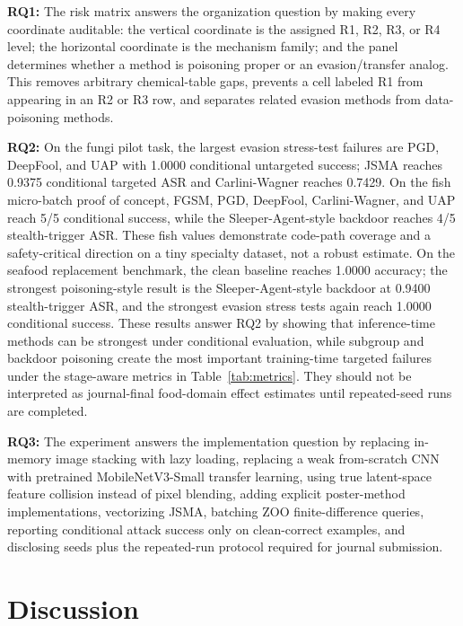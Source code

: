 ﻿\documentclass[6p,10pt,times]{ieeeaccess}
\begin{document}
\textbf{RQ1:} The risk matrix answers the organization question by making every coordinate auditable: the vertical coordinate is the assigned R1, R2, R3, or R4 level; the horizontal coordinate is the mechanism family; and the panel determines whether a method is poisoning proper or an evasion/transfer analog. This removes arbitrary chemical-table gaps, prevents a cell labeled R1 from appearing in an R2 or R3 row, and separates related evasion methods from data-poisoning methods.

\textbf{RQ2:} On the fungi pilot task, the largest evasion stress-test failures are PGD, DeepFool, and UAP with 1.0000 conditional untargeted success; JSMA reaches 0.9375 conditional targeted ASR and Carlini-Wagner reaches 0.7429. On the fish micro-batch proof of concept, FGSM, PGD, DeepFool, Carlini-Wagner, and UAP reach 5/5 conditional success, while the Sleeper-Agent-style backdoor reaches 4/5 stealth-trigger ASR. These fish values demonstrate code-path coverage and a safety-critical direction on a tiny specialty dataset, not a robust estimate. On the seafood replacement benchmark, the clean baseline reaches 1.0000 accuracy; the strongest poisoning-style result is the Sleeper-Agent-style backdoor at 0.9400 stealth-trigger ASR, and the strongest evasion stress tests again reach 1.0000 conditional success. These results answer RQ2 by showing that inference-time methods can be strongest under conditional evaluation, while subgroup and backdoor poisoning create the most important training-time targeted failures under the stage-aware metrics in Table~\ref{tab:metrics}. They should not be interpreted as journal-final food-domain effect estimates until repeated-seed runs are completed.

\textbf{RQ3:} The experiment answers the implementation question by replacing in-memory image stacking with lazy loading, replacing a weak from-scratch CNN with pretrained MobileNetV3-Small transfer learning, using true latent-space feature collision instead of pixel blending, adding explicit poster-method implementations, vectorizing JSMA, batching ZOO finite-difference queries, reporting conditional attack success only on clean-correct examples, and disclosing seeds plus the repeated-run protocol required for journal submission.

\section{Discussion}
\end{document}
